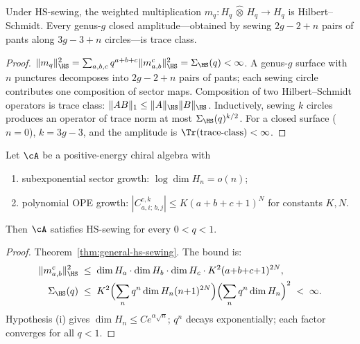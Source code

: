 \begin{proposition}%
\label{prop:g1-trace-class}%
%
Under HS-sewing, the weighted multiplication
$m_q \colon H_q \,\widehat{\otimes}\, H_q \to H_q$
is Hilbert--Schmidt.  Every genus-$g$ closed amplitude---obtained
by sewing $2g - 2 + n$ pairs of pants along $3g - 3 + n$
circles---is trace class.
\end{proposition}

\begin{proof}
$\|m_q\|_{\HS}^2 = \sum_{a,b,c} q^{a+b+c}
\|m_{a,b}^c\|_{\HS}^2 = \Sigma_{\HS}(q) < \infty$.
A genus-$g$ surface with $n$ punctures decomposes into
$2g - 2 + n$ pairs of pants; each sewing circle contributes
one composition of sector maps.  Composition of two
Hilbert--Schmidt operators is trace class:
$\|AB\|_1 \leq \|A\|_{\HS} \|B\|_{\HS}$.  Inductively,
sewing $k$ circles produces an operator of trace norm at most
$\Sigma_{\HS}(q)^{k/2}$.  For a closed surface ($n = 0$),
$k = 3g - 3$, and the amplitude is
$\Tr(\text{trace-class}) < \infty$.
\end{proof}

\begin{theorem}%
\label{thm:g1-general-hs}%
%
Let\/ $\cA$ be a positive-energy chiral algebra with
\begin{enumerate}[label=\textup{(\roman*)}]
\item subexponential sector growth:
  $\log\dim H_n = o(n)$;
\item polynomial OPE growth:
  $|C^{c,k}_{a,i;\,b,j}| \leq K(a+b+c+1)^N$ for constants
  $K, N$.
\end{enumerate}
Then $\cA$ satisfies HS-sewing for every $0 < q < 1$.
\end{theorem}

\begin{proof}
Theorem~\ref{thm:general-hs-sewing}.  The bound is:
\begin{align}\label{eq:g1-hs-bound}
\|m_{a,b}^c\|_{\HS}^2
&\;\leq\;
\dim H_a \cdot \dim H_b \cdot \dim H_c
\cdot K^2(a{+}b{+}c{+}1)^{2N}, \\
\Sigma_{\HS}(q)
&\;\leq\;
K^2 \Bigl(\sum_n q^n \dim H_n (n{+}1)^{2N}\Bigr)
\Bigl(\sum_n q^n \dim H_n\Bigr)^2 \;<\; \infty.
\end{align}
Hypothesis (i) gives $\dim H_n \leq Ce^{\alpha\sqrt{n}}$;
$q^n$ decays exponentially; each factor converges for all
$q < 1$.
\end{proof}

